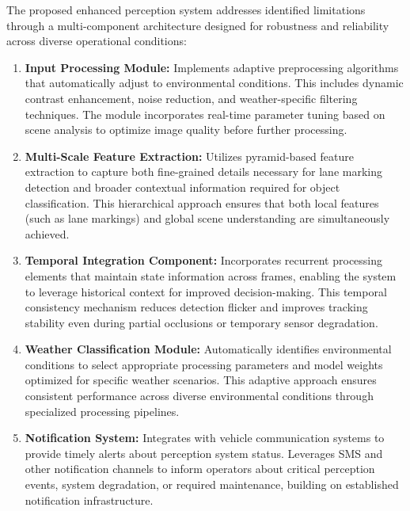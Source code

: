 \begin{doublespace}
The proposed enhanced perception system addresses identified limitations through a multi-component architecture designed for robustness and reliability across diverse operational conditions:

\begin{enumerate}[leftmargin=*,nosep]
    \item \textbf{Input Processing Module:} Implements adaptive preprocessing algorithms that automatically adjust to environmental conditions. This includes dynamic contrast enhancement, noise reduction, and weather-specific filtering techniques. The module incorporates real-time parameter tuning based on scene analysis to optimize image quality before further processing.
    
    \item \textbf{Multi-Scale Feature Extraction:} Utilizes pyramid-based feature extraction to capture both fine-grained details necessary for lane marking detection and broader contextual information required for object classification. This hierarchical approach ensures that both local features (such as lane markings) and global scene understanding are simultaneously achieved.
    
    \item \textbf{Temporal Integration Component:} Incorporates recurrent processing elements that maintain state information across frames, enabling the system to leverage historical context for improved decision-making. This temporal consistency mechanism reduces detection flicker and improves tracking stability even during partial occlusions or temporary sensor degradation.
    
    \item \textbf{Weather Classification Module:} Automatically identifies environmental conditions to select appropriate processing parameters and model weights optimized for specific weather scenarios. This adaptive approach ensures consistent performance across diverse environmental conditions through specialized processing pipelines.
    
    \item \textbf{Notification System:} Integrates with vehicle communication systems to provide timely alerts about perception system status. Leverages SMS and other notification channels to inform operators about critical perception events, system degradation, or required maintenance, building on established notification infrastructure.
\end{enumerate}
\end{doublespace}

